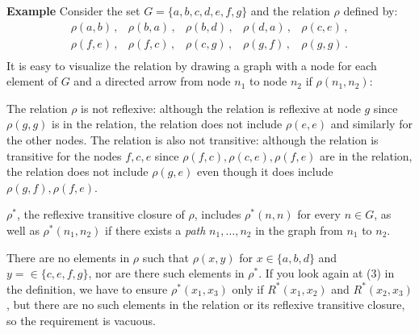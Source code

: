 \documentclass[12pt,a4paper]{article}
\newenvironment{example}{\textbf{Example}}{}
\begin{document}
\begin{example}
Consider the set $G=\{a,b,c,d,e,f,g\}$ and the relation $\rho$ defined by:
\[
\begin{array}{llllll}
\rho(a,b)\,, & \rho(b,a)\,, & \rho(b,d)\,, & \rho(d,a)\,,& \rho(c,e)\,,\\
\rho(f,e)\,,&\rho(f,c)\,,&\rho(c,g)\,,&\rho(g,f)\,,&\rho(g,g)\,.\\
\end{array}
\]
It is easy to visualize the relation by drawing a graph with a node for each element of $G$ and a directed arrow from node $n_1$ to node $n_2$ if $\rho(n_1,n_2)$:
\begin{center}
\end{center}
The relation $\rho$ is not reflexive: although the relation is reflexive at node $g$ since $\rho(g,g)$ is in the relation, the relation does not include $\rho(e,e)$ and similarly for the other nodes. The relation is also not transitive: although the relation is transitive for the nodes $f,c,e$ since $\rho(f,c), \rho(c,e), \rho(f,e)$ are in the relation, the relation does not include $\rho(g,e)$ even though it does include $\rho(g,f),\rho(f,e)$.

$\rho^{*}$, the reflexive transitive closure of $\rho$, includes $\rho^{*}(n,n)$ for every $n\in G$, as well as $\rho^{*}(n_1,n_2)$ if there exists a \emph{path} $n_1,\ldots,n_2$ in the graph from $n_1$ to $n_2$.

There are no elements in $\rho$ such that $\rho(x,y)$ for $x\in \{a,b,d\}$ and $y=\in\{c,e,f,g\}$, nor are there such elements in $\rho^{*}$. If you look again at (3) in the definition, we have to ensure $\rho^{*}(x_1,x_3)$ only if $R^{*}(x_{1},x_{2})$ and $R^{*}(x_{2},x_{3})$, but there are no such elements in the relation or its reflexive transitive closure, so the requirement is vacuous.
\end{example}
\end{document}
